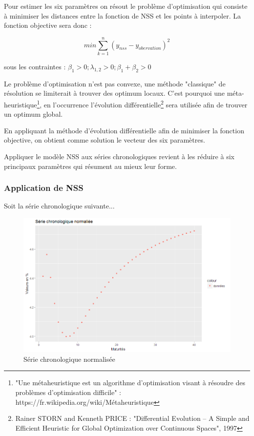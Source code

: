 Pour estimer les six paramètres on résout le problème d'optimisation qui consiste à minimiser les distances entre la fonction de NSS et les points à interpoler. La fonction objective sera donc :

\begin{equation}
min\sum_{k=1}^n (y_{nss}-y_{obervation})^{2}
\label{obj}
\end{equation}

sous les contraintes : $ \beta_{1} > 0; \lambda_{1,2} > 0; \beta_{1}+\beta_{2}>0 $

Le problème d'optimisation n'est pas convexe, une méthode "classique" de résolution se limiterait à trouver des optimum locaux. C'est pourquoi une méta-heuristique\footnote{"Une métaheuristique est un algorithme d’optimisation visant à résoudre des problèmes d’optimisation difficile" : https://fr.wikipedia.org/wiki/Métaheuristique}, en l’occurrence l'évolution différentielle\footnote{Rainer STORN and Kenneth PRICE : "Differential Evolution – A Simple and Efficient Heuristic for Global Optimization over Continuous Spaces", 1997} sera utilisée afin de trouver un optimum global.

En appliquant la méthode d'évolution différentielle afin de minimiser la fonction objective, on obtient comme solution le vecteur des six paramètres.

Appliquer le modèle NSS aux séries chronologiques revient à les réduire à six principaux paramètres qui résument au mieux leur forme.
\subsubsection{Application de NSS}

Soit la série chronologique suivante...

\begin{figure}[H]
\centering
\caption{Série chronologique normalisée}
   \includegraphics[scale=0.7]{img/data.png}
\end{figure}

